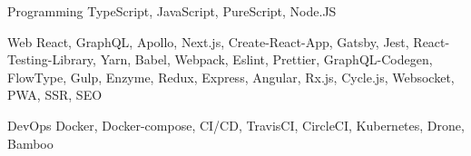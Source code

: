 

\begin{cvskills}

  \cvskill
    {Programming} %
    {TypeScript, JavaScript, PureScript, Node.JS} %

  \cvskill
    {Web} %
    {React, GraphQL, Apollo, Next.js, Create-React-App, Gatsby, Jest, React-Testing-Library, Yarn, Babel, Webpack, Eslint, Prettier, GraphQL-Codegen, FlowType, Gulp, Enzyme, Redux, Express, Angular, Rx.js, Cycle.js, Websocket, PWA, SSR, SEO} %

  \cvskill
    {DevOps} %
    {Docker, Docker-compose, CI/CD, TravisCI, CircleCI, Kubernetes, Drone, Bamboo} %


\end{cvskills}
